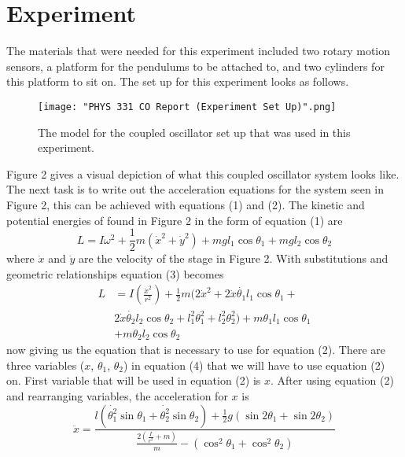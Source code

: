 \documentclass[twocolumn]{article}
\begin{document}
\section*{Experiment}
The materials that were needed for this experiment included two rotary motion sensors, a platform for the pendulums to be attached to, and two cylinders for this platform to sit on. The set up for this experiment looks as follows.
\begin{figure}[htbp]
\begin{center}
\texttt{[image: "PHYS 331 CO Report (Experiment Set Up)".png]}
\caption{The model for the coupled oscillator set up that was used in this experiment.}
\end{center}
\end{figure}
\newline
Figure 2 gives a visual depiction of what this coupled oscillator system looks like. The next task is to write out the acceleration equations for the system seen in Figure 2, this can be achieved with equations (1) and (2). The kinetic and potential energies of found in Figure 2 in the form of equation (1) are
\begin{equation}\label{3}
L=I\omega^2+\frac{1}{2}m(\dot{x}^2+\dot{y}^2)+mgl_{1}\cos{\theta_1}+mgl_{2}\cos{\theta_2}
\end{equation}
where $\dot{x}$ and $\dot{y}$ are the velocity of the stage in Figure 2. With substitutions and geometric relationships equation (3) becomes 
\begin{equation}\label{4}
\begin{split}
L&=I(\frac{\dot{x}^2}{r^2})+\frac{1}{2}m(2\dot{x}^2+2\dot{x}\dot{\theta_1}l_{1}\cos{\theta_1}+ \\& 
2\dot{x}\dot{\theta_2}l_{2}\cos{\theta_2}+l_{1}^2\theta_{1}^2+l_{2}^2\theta_{2}^2)+m\theta_{1}l_{1}\cos{\theta_{1}} \\&
+m\theta_{2}l_{2}\cos{\theta_{2}} 
\end{split}
\end{equation}
now giving us the equation that is necessary to use for equation (2). There are three variables ($x$, $\theta_{1}$, $\theta_{2}$) in equation (4) that we will have to use equation (2) on. First variable that will be used in equation (2) is $x$. After using equation (2) and rearranging variables, the acceleration for $x$ is 
\begin{equation}\label{5}
\ddot{x}=\frac{l(\dot{\theta_{1}^2}\sin{\theta_{1}}+\dot{\theta_{2}^2}\sin{\theta_{2}})+\frac{1}{2}g(\sin{2\theta_{1}}+\sin{2\theta_{2}})}{\frac{2(\frac{I}{r^2}+m)}{m}-(\cos^2{\theta_{1}}+\cos^2{\theta_{2}})}
\end{equation}
\end{document}
